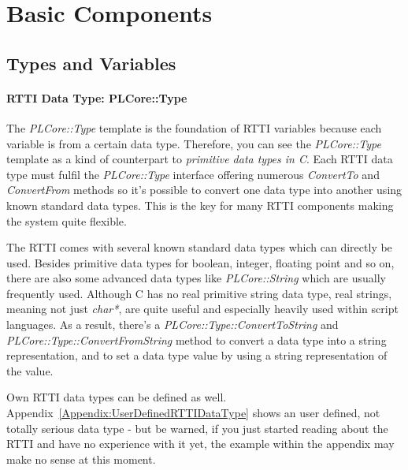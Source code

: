 \section{Basic Components}




\subsection{Types and Variables}
\paragraph{\ac{RTTI} Data Type: PLCore::Type}
The \emph{PLCore::Type} template is the foundation of \ac{RTTI} variables because each variable is from a certain data type. Therefore, you can see the \emph{PLCore::Type} template as a kind of counterpart to \emph{primitive data types in C}. Each \ac{RTTI} data type must fulfil the \emph{PLCore::Type} interface offering numerous \emph{ConvertTo} and \emph{ConvertFrom} methods so it's possible to convert one data type into another using known standard data types. This is the key for many \ac{RTTI} components making the system quite flexible.

The \ac{RTTI} comes with several known standard data types which can directly be used. Besides primitive data types for boolean, integer, floating point and so on, there are also some advanced data types like \emph{PLCore::String} which are usually frequently used. Although C has no real primitive string data type, real strings, meaning not just \emph{char*}, are quite useful and especially heavily used within script languages. As a result, there's a \emph{PLCore::Type::ConvertToString} and \emph{PLCore::Type::ConvertFromString} method to convert a data type into a string representation, and to set a data type value by using a string representation of the value.

Own \ac{RTTI} data types can be defined as well. Appendix~\ref{Appendix:UserDefinedRTTIDataType} shows an user defined, not totally serious data type - but be warned, if you just started reading about the \ac{RTTI} and have no experience with it yet, the example within the appendix may make no sense at this moment.


